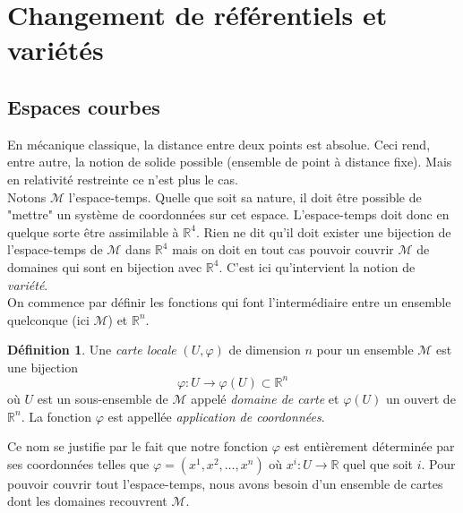 \documentclass[a4paper,11pt]{report}
\theoremstyle{definition}
\theoremstyle{plain}
\theoremstyle{definition}
\newtheorem{defn}{Définition}[chapter]
\theoremstyle{remark}
\newcommand{\M}{\mathscr{M}}
\begin{document}
    \section{Changement de référentiels et variétés}
    
        \subsection{Espaces courbes}
        
            En mécanique classique, la distance entre deux points est absolue. Ceci rend, entre autre, la notion de solide possible (ensemble de point à distance fixe). Mais en relativité restreinte ce n'est plus le cas. \\
            
            Notons $\M$ l'espace-temps. Quelle que soit sa nature, il doit être possible de "mettre" un système de coordonnées sur cet espace. L'espace-temps doit donc en quelque sorte être assimilable à $\mathbb{R}^4$. Rien ne dit qu'il doit exister une bijection de l'espace-temps de $\M$ dans $\mathbb{R}^4$ mais on doit en tout cas pouvoir couvrir $\M$ de domaines qui sont en bijection avec $\mathbb{R}^4$. C'est ici qu'intervient la notion de \textit{variété}.\\
            
            On commence par définir les fonctions qui font l'intermédiaire entre un ensemble quelconque (ici $\M$) et $\mathbb{R}^n$.
            \begin{defn}
                Une \textit{carte locale} $(U,\varphi)$ de dimension $n$ pour un ensemble $\M$ est une bijection
                \begin{equation}
                    \varphi:U\to\varphi(U) \subset\mathbb{R}^n
                \end{equation}
                où $U$ est un sous-ensemble de $\M$ appelé \textit{domaine de carte} et $\varphi(U)$ un ouvert de $\mathbb{R}^n$. La fonction $\varphi$ est appellée \textit{application de coordonnées}.
            \end{defn}
            
            Ce nom se justifie par le fait que notre fonction $\varphi$ est entièrement déterminée par ses coordonnées telles que $\varphi = (x^1, x^2, \ldots, x^n)$ où $x^i: U \to \mathbb{R}$ quel que soit $i$. Pour pouvoir couvrir tout l'espace-temps, nous avons besoin d'un ensemble de cartes dont les domaines recouvrent $\M$.
            
\end{document}
